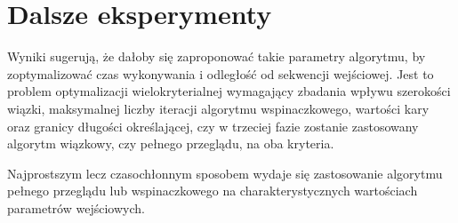 \documentclass{article}
\begin{document}
\section{Dalsze eksperymenty}

Wyniki sugerują, że dałoby się zaproponować takie parametry algorytmu, by zoptymalizować czas wykonywania i odległość od sekwencji wejściowej.
Jest to problem optymalizacji wielokryterialnej wymagający zbadania wpływu szerokości wiązki, maksymalnej liczby iteracji algorytmu wspinaczkowego, wartości kary oraz granicy długości określającej, czy w trzeciej fazie zostanie zastosowany algorytm wiązkowy, czy pełnego przeglądu, na oba kryteria.

Najprostszym lecz czasochłonnym sposobem wydaje się zastosowanie algorytmu pełnego przeglądu lub wspinaczkowego na charakterystycznych wartościach parametrów wejściowych.
\end{document}

